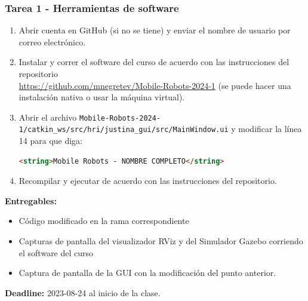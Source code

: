 \begin{frame}[containsverbatim]\frametitle{Tarea 1 - Herramientas de software}
  \begin{enumerate}
  \item Abrir cuenta en GitHub (si no se tiene) y enviar el nombre de usuario por correo electrónico. 
  \item Instalar y correr el software del curso de acuerdo con las instrucciones del repositorio\\ \url{https://github.com/mnegretev/Mobile-Robots-2024-1} (se puede hacer una instalación nativa o usar la máquina virtual).
  \item Abrir el archivo \texttt{Mobile-Robots-2024-1/catkin\_ws/src/hri/justina\_gui/src/MainWindow.ui} y modificar la línea 14 para que diga:
    \begin{lstlisting}[language=html,firstnumber=14]
      <string>Mobile Robots - NOMBRE COMPLETO</string>
    \end{lstlisting}
  \item Recompilar y ejecutar de acuerdo con las instrucciones del repositorio.
  \end{enumerate}
  \textbf{Entregables:}
  \begin{itemize}
  \item Código modificado en la rama correspondiente
  \item Capturas de pantalla del visualizador RViz y del Simulador Gazebo corriendo el software del curso
  \item Captura de pantalla de la GUI con la modificación del punto anterior. 
  \end{itemize}
  \textbf{Deadline: } 2023-08-24 al inicio de la clase. 
\end{frame}
